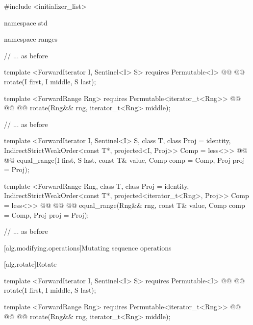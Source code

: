 \begin{codeblock}
#include <initializer_list>

namespace std { namespace ranges {
  // ... as before

  template <ForwardIterator I, Sentinel<I> S>
    requires Permutable<I>
    @@
    @@
      rotate(I first, I middle, S last);

  template <ForwardRange Rng>
    requires Permutable<iterator_t<Rng>>
    @@
                @@
    @@
      rotate(Rng&& rng, iterator_t<Rng> middle);

  // ... as before

  template <ForwardIterator I, Sentinel<I> S, class T, class Proj = identity,
      IndirectStrictWeakOrder<const T*, projected<I, Proj>> Comp = less<>>
    @@
    @@
      equal_range(I first, S last, const T& value, Comp comp = Comp{}, Proj proj = Proj{});

  template <ForwardRange Rng, class T, class Proj = identity,
      IndirectStrictWeakOrder<const T*, projected<iterator_t<Rng>, Proj>> Comp = less<>>
    @@
                @@
    @@
      equal_range(Rng&& rng, const T& value, Comp comp = Comp{}, Proj proj = Proj{});

  // ... as before
}}
\end{codeblock}

\setcounter{section}{3}

[alg.modifying.operations]{Mutating sequence operations}

\setcounter{subsection}{10}

[alg.rotate]{Rotate}

%
\begin{itemdecl}
template <ForwardIterator I, Sentinel<I> S>
  requires Permutable<I>
  @@
  @@
    rotate(I first, I middle, S last);

template <ForwardRange Rng>
  requires Permutable<iterator_t<Rng>>
  @@
              @@
  @@
    rotate(Rng&& rng, iterator_t<Rng> middle);
\end{itemdecl}

